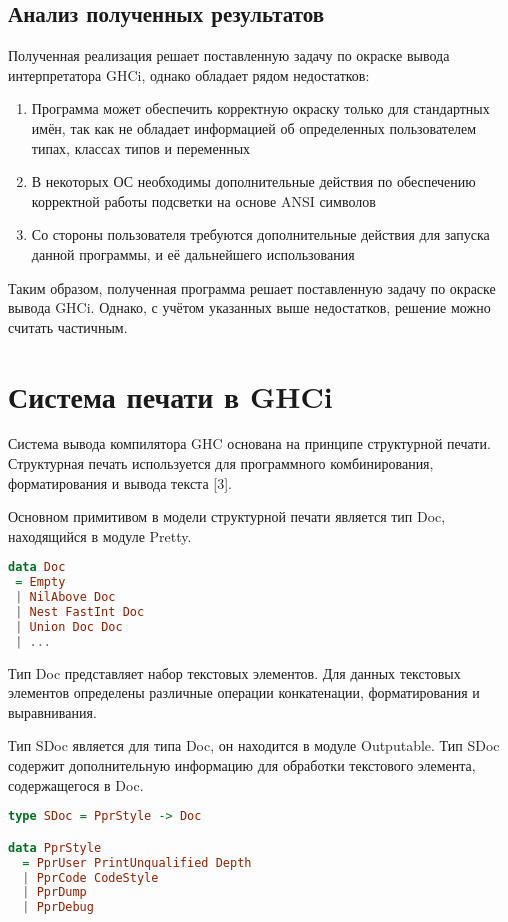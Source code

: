 \subsection{Анализ полученных результатов}
Полученная реализация решает поставленную задачу по окраске вывода интерпретатора GHCi, однако обладает рядом недостатков:

\begin{enumerate}
\item Программа может обеспечить корректную окраску только для стандартных имён, так как не обладает информацией об определенных пользователем типах, классах типов и переменных
\item В некоторых ОС необходимы дополнительные действия по обеспечению корректной работы подсветки на основе ANSI символов
\item Со стороны пользователя требуются дополнительные действия для запуска данной программы, и её дальнейшего использования
\end{enumerate}

Таким образом, полученная программа решает поставленную задачу по окраске вывода GHCi. Однако, с учётом указанных выше недостатков, решение можно считать частичным.

\section{Система печати в GHCi}
Система вывода компилятора GHC основана на принципе структурной печати. Структурная печать используется для программного комбинирования, форматирования и вывода текста [3].

Основном примитивом в модели структурной печати является тип Doc, находящийся в модуле Pretty.
\begin{lstlisting}[language=Haskell]
data Doc
 = Empty
 | NilAbove Doc
 | Nest FastInt Doc
 | Union Doc Doc
 | ...
\end{lstlisting}

Тип Doc представляет набор текстовых элементов. Для данных текстовых элементов определены различные операции конкатенации, форматирования и выравнивания.

Тип SDoc является для типа Doc, он находится в модуле Outputable. Тип SDoc содержит дополнительную информацию для обработки текстового элемента, содержащегося в Doc.
\begin{lstlisting}[language=Haskell]
type SDoc = PprStyle -> Doc

data PprStyle
  = PprUser PrintUnqualified Depth
  | PprCode CodeStyle
  | PprDump
  | PprDebug
\end{lstlisting}

